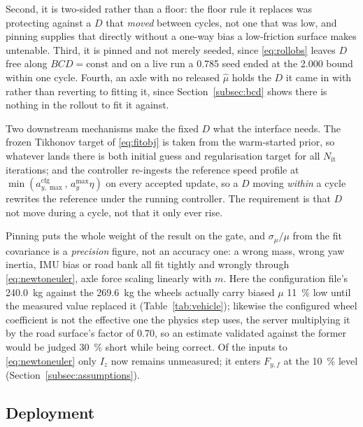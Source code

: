 Second, it is two-sided rather than a floor: the floor rule it replaces was
protecting against a $D$ that \emph{moved} between cycles, not one that was
low, and pinning supplies that directly without a one-way bias a low-friction
surface makes untenable. Third, it is pinned and not merely seeded, since
\eqref{eq:rollobs} leaves $D$ free along $BCD=\mathrm{const}$ and on a live run
a \num{0.785} seed ended at the \num{2.000} bound within one cycle. Fourth, an
axle with no released $\hat\mu$ holds the $D$ it came in with rather than
reverting to fitting it, since Section~\ref{subsec:bcd} shows there is nothing
in the rollout to fit it against.

Two downstream mechanisms make the fixed $D$ what the interface needs. The
frozen Tikhonov target of \eqref{eq:fitobj} is taken from the warm-started
prior, so whatever lands there is both initial guess and regularisation target
for all $N_{\mathrm{it}}$ iterations; and the controller re-ingests the
reference speed profile at
$\min(a_{y,\max}^{\mathrm{cfg}},\,a_{y}^{\max}\eta)$ on every accepted update,
so a $D$ moving \emph{within} a cycle rewrites the reference under the running
controller. The requirement is that $D$ not move during a cycle, not that it
only ever rise.

Pinning puts the whole weight of the result on the gate, and
$\sigma_{\mu}/\mu$ from the fit covariance is a \emph{precision} figure, not an
accuracy one: a wrong mass, wrong yaw inertia, IMU bias or road bank all fit
tightly and wrongly through \eqref{eq:newtoneuler}, axle force scaling linearly
with $m$. Here the configuration file's \SI{240.0}{\kilo\gram} against the
\SI{269.6}{\kilo\gram} the wheels actually carry biased $\mu$
\SI{11}{\percent} low until the measured value replaced it
(Table~\ref{tab:vehicle}); likewise the configured wheel coefficient is not the
effective one the physics step uses, the server multiplying it by the road
surface's factor of \num{0.70}, so an estimate validated against the former
would be judged \SI{30}{\percent} short while being correct. Of the inputs to
\eqref{eq:newtoneuler} only $I_{z}$ now remains unmeasured; it enters
$F_{y,f}$ at the \SI{10}{\percent} level (Section~\ref{subsec:assumptions}).

\subsection{Deployment}
\label{subsec:deployment}

